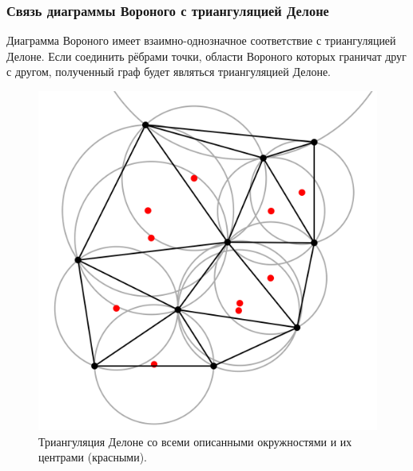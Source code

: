 \newpage

\subsubsection*{Связь диаграммы Вороного с триангуляцией Делоне}

Диаграмма Вороного имеет взаимно-однозначное соответствие с триангуляцией Делоне. Если соединить рёбрами точки, области Вороного которых граничат друг с другом, полученный граф будет являться триангуляцией Делоне.

\begin{figure}[H]
    \begin{center}
        \begin{minipage}[h]{0.45\linewidth}
            \includegraphics[width=1\linewidth]{delaunay-circumcircles-centers.png}
            \caption{Триангуляция Делоне со всеми описанными окружностями и их центрами (красными).}
        \end{minipage}
        \hfill
        \begin{minipage}[h]{0.45\linewidth}

\end{minipage}
\end{center}
\end{figure}
